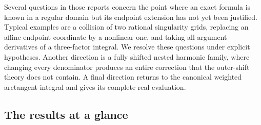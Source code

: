 \documentclass[11pt,a4paper]{article}
\numberwithin{equation}{section}
\theoremstyle{definition}
\theoremstyle{remark}
\begin{document}
Several questions in those reports concern the point where an exact
formula is known in a regular domain but its endpoint extension has not
yet been justified. Typical examples are a collision of two rational
singularity grids, replacing an affine endpoint coordinate by a nonlinear
one, and taking all argument derivatives of a three-factor integral.
We resolve these questions under explicit hypotheses. Another direction
is a fully shifted nested harmonic family, where changing every
denominator produces an entire correction that the outer-shift theory
does not contain. A final direction returns to the canonical weighted
arctangent integral and gives its complete real evaluation.

\subsection{The results at a glance}
\end{document}
